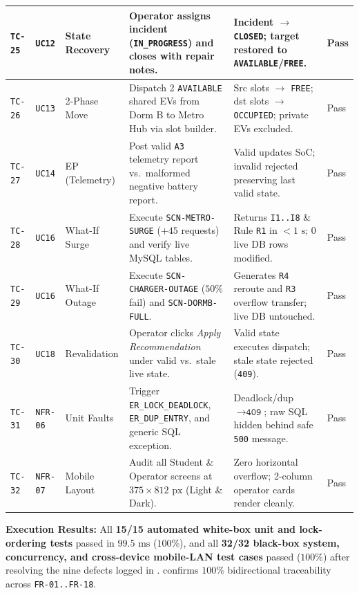 \begin{table}[H]
\begin{tabularx}{\textwidth}{|C{1.25cm}|C{1.40cm}|L{1.95cm}|Y|L{3.95cm}|C{0.95cm}|}
    \hline
    \texttt{TC-25} & \texttt{UC12} & State Recovery & Operator assigns incident (\texttt{IN\_\allowbreak PROGRESS}) and closes with repair notes. & Incident $\rightarrow$ \texttt{CLOSED}; target restored to \texttt{AVAILABLE}/\texttt{FREE}. & Pass \\
    \hline
    \texttt{TC-26} & \texttt{UC13} & 2-Phase Move & Dispatch 2 \texttt{AVAILABLE} shared EVs from Dorm B to Metro Hub via slot builder. & Src slots $\rightarrow$ \texttt{FREE}; dst slots $\rightarrow$ \texttt{OCCUPIED}; private EVs excluded. & Pass \\
    \hline
    \texttt{TC-27} & \texttt{UC14} & EP (Telemetry) & Post valid \texttt{A3} telemetry report vs.\ malformed negative battery report. & Valid updates SoC; invalid rejected preserving last valid state. & Pass \\
    \hline
    \texttt{TC-28} & \texttt{UC16} & What-If Surge & Execute \texttt{SCN-METRO-SURGE} ($+45$ requests) and verify live MySQL tables. & Returns \texttt{I1..I8} \& Rule \texttt{R1} in $<1\text{ s}$; $0$ live DB rows modified. & Pass \\
    \hline
    \texttt{TC-29} & \texttt{UC16} & What-If Outage & Execute \texttt{SCN-CHARGER-OUTAGE} ($50\%$ fail) and \texttt{SCN-DORMB-FULL}. & Generates \texttt{R4} reroute and \texttt{R3} overflow transfer; live DB untouched. & Pass \\
    \hline
    \texttt{TC-30} & \texttt{UC18} & Revalidation & Operator clicks \textit{Apply Recommendation} under valid vs.\ stale live state. & Valid state executes dispatch; stale state rejected (\texttt{409}). & Pass \\
    \hline
    \texttt{TC-31} & \texttt{NFR-06} & Unit Faults & Trigger \texttt{ER\_\allowbreak LOCK\_\allowbreak DEADLOCK}, \texttt{ER\_\allowbreak DUP\_\allowbreak ENTRY}, and generic SQL exception. & Deadlock/dup $\rightarrow \texttt{409}$; raw SQL hidden behind safe \texttt{500} message. & Pass \\
    \hline
    \texttt{TC-32} & \texttt{NFR-07} & Mobile Layout & Audit all Student \& Operator screens at $375\times 812\text{ px}$ (Light \& Dark). & Zero horizontal overflow; 2-column operator cards render cleanly. & Pass \\
    \hline
  \end{tabularx}
\end{table}

\label{subsec:test-results}
\textbf{Execution Results:} All \textbf{15/15 automated white-box unit and lock-ordering tests} passed in $99.5\text{ ms}$ ($100\%$), and all \textbf{32/32 black-box system, concurrency, and cross-device mobile-LAN test cases} passed ($100\%$) after resolving the nine defects logged in .  confirms $100\%$ bidirectional traceability across \texttt{FR-01..FR-18}.

